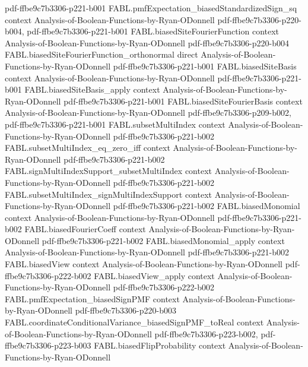 \begin{theorem}
{    pdf-ffbe9c7b3306-p221-b001}
\proofstep
  {FABL.pmfExpectation_biasedStandardizedSign_sq}
  {context}
  {Analysis-of-Boolean-Functions-by-Ryan-ODonnell}
  {pdf-ffbe9c7b3306-p220-b004,
    pdf-ffbe9c7b3306-p221-b001}
\proofstep
  {FABL.biasedSiteFourierFunction}
  {context}
  {Analysis-of-Boolean-Functions-by-Ryan-ODonnell}
  {pdf-ffbe9c7b3306-p220-b004}
\proofstep
  {FABL.biasedSiteFourierFunction_orthonormal}
  {direct}
  {Analysis-of-Boolean-Functions-by-Ryan-ODonnell}
  {pdf-ffbe9c7b3306-p221-b001}
\proofstep
  {FABL.biasedSiteBasis}
  {context}
  {Analysis-of-Boolean-Functions-by-Ryan-ODonnell}
  {pdf-ffbe9c7b3306-p221-b001}
\proofstep
  {FABL.biasedSiteBasis_apply}
  {context}
  {Analysis-of-Boolean-Functions-by-Ryan-ODonnell}
  {pdf-ffbe9c7b3306-p221-b001}
\proofstep
  {FABL.biasedSiteFourierBasis}
  {context}
  {Analysis-of-Boolean-Functions-by-Ryan-ODonnell}
  {pdf-ffbe9c7b3306-p209-b002,
    pdf-ffbe9c7b3306-p221-b001}
\proofstep
  {FABL.subsetMultiIndex}
  {context}
  {Analysis-of-Boolean-Functions-by-Ryan-ODonnell}
  {pdf-ffbe9c7b3306-p221-b002}
\proofstep
  {FABL.subsetMultiIndex_eq_zero_iff}
  {context}
  {Analysis-of-Boolean-Functions-by-Ryan-ODonnell}
  {pdf-ffbe9c7b3306-p221-b002}
\proofstep
  {FABL.signMultiIndexSupport_subsetMultiIndex}
  {context}
  {Analysis-of-Boolean-Functions-by-Ryan-ODonnell}
  {pdf-ffbe9c7b3306-p221-b002}
\proofstep
  {FABL.subsetMultiIndex_signMultiIndexSupport}
  {context}
  {Analysis-of-Boolean-Functions-by-Ryan-ODonnell}
  {pdf-ffbe9c7b3306-p221-b002}
\proofstep
  {FABL.biasedMonomial}
  {context}
  {Analysis-of-Boolean-Functions-by-Ryan-ODonnell}
  {pdf-ffbe9c7b3306-p221-b002}
\proofstep
  {FABL.biasedFourierCoeff}
  {context}
  {Analysis-of-Boolean-Functions-by-Ryan-ODonnell}
  {pdf-ffbe9c7b3306-p221-b002}
\proofstep
  {FABL.biasedMonomial_apply}
  {context}
  {Analysis-of-Boolean-Functions-by-Ryan-ODonnell}
  {pdf-ffbe9c7b3306-p221-b002}
\proofstep
  {FABL.biasedView}
  {context}
  {Analysis-of-Boolean-Functions-by-Ryan-ODonnell}
  {pdf-ffbe9c7b3306-p222-b002}
\proofstep
  {FABL.biasedView_apply}
  {context}
  {Analysis-of-Boolean-Functions-by-Ryan-ODonnell}
  {pdf-ffbe9c7b3306-p222-b002}
\proofstep
  {FABL.pmfExpectation_biasedSignPMF}
  {context}
  {Analysis-of-Boolean-Functions-by-Ryan-ODonnell}
  {pdf-ffbe9c7b3306-p220-b003}
\proofstep
  {FABL.coordinateConditionalVariance_biasedSignPMF_toReal}
  {context}
  {Analysis-of-Boolean-Functions-by-Ryan-ODonnell}
  {pdf-ffbe9c7b3306-p223-b002,
    pdf-ffbe9c7b3306-p223-b003}
\proofstep
  {FABL.biasedFlipProbability}
  {context}
  {Analysis-of-Boolean-Functions-by-Ryan-ODonnell}

\end{theorem}
